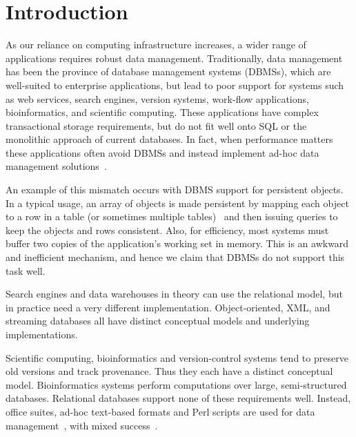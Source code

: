 \documentclass[letterpaper,twocolumn,10pt]{article}
\begin{document}




\section{Introduction}
\label{sec:intro}
As our reliance on computing infrastructure increases, a wider range
of applications requires robust data management.  Traditionally, data
management has been the province of database management systems
(DBMSs), which are well-suited to enterprise applications, but lead to
poor support for systems such as web services, search engines, version
systems, work-flow applications, bioinformatics, and
scientific computing.  These applications have complex transactional
storage requirements, but do not fit well onto SQL or the monolithic
approach of current databases.  In fact, when performance matters
these applications often avoid DBMSs and instead implement ad-hoc data
management solutions~\cite{mapReduce,SNS}.

An example of this mismatch occurs with DBMS support for persistent objects.
In a typical usage, an array of objects is made persistent by mapping
each object to a row in a table (or sometimes multiple
tables)~\cite{hibernate} and then issuing queries to keep the objects
and rows consistent. 
Also, for efficiency, most systems
must buffer two copies of the application's working set in memory.
This is an awkward and inefficient mechanism, and hence we claim that
DBMSs do not support this task well.

Search engines and data warehouses in theory can use the relational
model, but in practice need a very different implementation.
Object-oriented, XML, and streaming databases all have distinct
conceptual models and underlying implementations.

Scientific computing, bioinformatics and version-control systems tend
to preserve old versions and track provenance.  Thus they each have a
distinct conceptual model.  Bioinformatics systems perform
computations over large, semi-structured databases.  Relational
databases support none of these requirements well. Instead, office
suites, ad-hoc text-based formats and Perl scripts are used for data
management~\cite{perl}, with mixed success~\cite{excel}.
\end{document}
